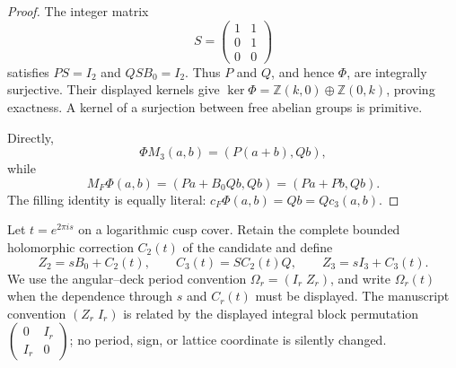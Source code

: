 \begin{proof}
The integer matrix
\[
 S=\begin{pmatrix}1&1\\0&1\\0&0\end{pmatrix}
\]
satisfies $PS=I_2$ and $QSB_0=I_2$.  Thus $P$ and $Q$, and hence $\Phi$,
are integrally surjective.  Their displayed kernels give
$\ker\Phi=\mathbb Z(k,0)\oplus\mathbb Z(0,k)$, proving exactness.  A kernel of a
surjection between free abelian groups is primitive.

Directly,
\[
 \Phi M_3(a,b)=(P(a+b),Qb),
\]
while
\[
 M_F\Phi(a,b)=(Pa+B_0Qb,Qb)=(Pa+Pb,Qb).
\]
The filling identity is equally literal:
$c_F\Phi(a,b)=Qb=Qc_3(a,b)$.
\end{proof}

Let $t=e^{2\pi i s}$ on a logarithmic cusp cover.  Retain the complete
bounded holomorphic correction $C_2(t)$ of the candidate and define
\begin{equation}
 Z_2=sB_0+C_2(t),\qquad
 C_3(t)=S C_2(t)Q,\qquad
 Z_3=sI_3+C_3(t).
 \label{h24:eq:period-extension}
\end{equation}
We use the angular--deck period convention
$\Omega_r=(I_r\;Z_r)$, and write $\Omega_r(t)$ when the dependence through
$s$ and $C_r(t)$ must be displayed.  The manuscript convention
$(Z_r\;I_r)$ is related by the displayed integral block permutation
$\left(\begin{smallmatrix}0&I_r\\I_r&0\end{smallmatrix}\right)$; no
period, sign, or lattice coordinate is silently changed.


